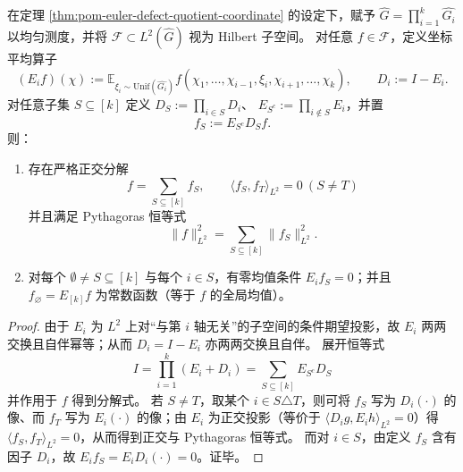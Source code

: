 \begin{theorem}\label{thm:pom-euler-defect-orthogonal-pythagoras}
在定理 \ref{thm:pom-euler-defect-quotient-coordinate} 的设定下，赋予 \(\widehat G=\prod_{i=1}^k\widehat{G_i}\) 以均匀测度，并将 \(\mathcal F\subset L^2(\widehat G)\) 视为 Hilbert 子空间。
对任意 \(f\in\mathcal F\)，定义坐标平均算子
\[
(E_i f)(\chi):=\mathbb{E}_{\xi_i\sim \mathrm{Unif}(\widehat{G_i})} f(\chi_1,\dots,\chi_{i-1},\xi_i,\chi_{i+1},\dots,\chi_k),
\qquad
D_i:=I-E_i.
\]
对任意子集 \(S\subseteq[k]\) 定义
\(
D_S:=\prod_{i\in S}D_i
\)、
\(
E_{S^c}:=\prod_{i\notin S}E_i
\)，并置
\[
f_S:=E_{S^c}D_S f.
\]
则：
\begin{enumerate}
  \item 存在严格正交分解
  \[
  \boxed{\;
  f=\sum_{S\subseteq[k]} f_S,\qquad
  \langle f_S,f_T\rangle_{L^2}=0\ (S\ne T)\;}
  \]
  并且满足 Pythagoras 恒等式
  \[
  \|f\|_{L^2}^2=\sum_{S\subseteq[k]}\|f_S\|_{L^2}^2.
  \]
  \item 对每个 \(\emptyset\ne S\subseteq[k]\) 与每个 \(i\in S\)，有零均值条件 \(E_i f_S=0\)；并且 \(f_{\varnothing}=E_{[k]}f\) 为常数函数（等于 \(f\) 的全局均值）。
\end{enumerate}
\end{theorem}
\begin{proof}
由于 \(E_i\) 为 \(L^2\) 上对“与第 \(i\) 轴无关”的子空间的条件期望投影，故 \(E_i\) 两两交换且自伴幂等；从而 \(D_i=I-E_i\) 亦两两交换且自伴。
展开恒等式
\[
I=\prod_{i=1}^k(E_i+D_i)=\sum_{S\subseteq[k]}E_{S^c}D_S
\]
并作用于 \(f\) 得到分解式。
若 \(S\ne T\)，取某个 \(i\in S\triangle T\)，则可将 \(f_S\) 写为 \(D_i(\cdot)\) 的像、而 \(f_T\) 写为 \(E_i(\cdot)\) 的像；由 \(E_i\) 为正交投影（等价于 \(\langle D_i g, E_i h\rangle_{L^2}=0\)）得 \(\langle f_S,f_T\rangle_{L^2}=0\)，从而得到正交与 Pythagoras 恒等式。
而对 \(i\in S\)，由定义 \(f_S\) 含有因子 \(D_i\)，故 \(E_i f_S=E_iD_i(\cdot)=0\)。证毕。
\end{proof}

